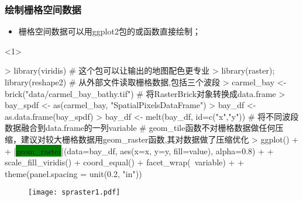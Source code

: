 \subsubsection{绘制栅格空间数据}
\begin{frame}[t,fragile]{\subsecname}{\subsubsecname}
\begin{itemize} 
\item<1-> 栅格空间数据可以用ggplot2包的或函数直接绘制；
\end{itemize}

\begin{overlayarea}{\textwidth}{\textheight}
\begin{onlyenv}<1>
\begin{rcode}
> library(viridis) # 这个包可以让输出的地图配色更专业 
> library(raster); library(reshape2)
# 从外部文件读取栅格数据,包括三个波段
> carmel_bay <- brick("data/carmel_bay_bathy.tif")
# 将RasterBrick对象转换成data.frame
> bay_spdf <- as(carmel_bay, "SpatialPixelsDataFrame")
> bay_df <- as.data.frame(bay_spdf)
> bay_df <- melt(bay_df, id=c("x","y")) # 将不同波段数据融合到data.frame的一列variable
# geom_tile函数不对栅格数据做任何压缩，建议对较大栅格数据用geom_raster函数,其对数据做了压缩优化
> ggplot() +
+     |\colorbox{green}{geom\_raster}|(data=bay_df, aes(x=x, y=y, fill=value), alpha=0.8) + 
+     scale_fill_viridis() + coord_equal() + facet_wrap(~variable) +
+     theme(panel.spacing = unit(0.2, "in"))
\end{rcode}
\begin{figure}[ht] \vspace{-10pt}
  \centering 
  \texttt{[image: spraster1.pdf]}
\end{figure}
\end{onlyenv}
\end{overlayarea}
\end{frame}

